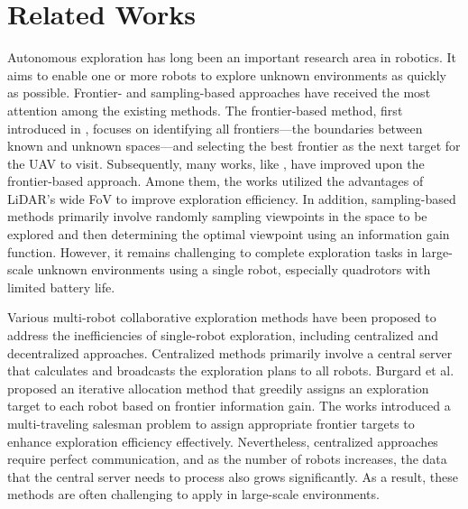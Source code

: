 \documentclass[letterpaper, 10pt, journal, twoside]{support/IEEEtran}
\begin{document}
\section{Related Works}
\label{sec:related_work}

Autonomous exploration has long been an important research area in robotics. It aims to enable one or more robots to explore unknown environments as quickly as possible. Frontier- and sampling-based approaches have received the most attention among the existing methods. The frontier-based method, first introduced in \cite{yamauchi1997frontier}, focuses on identifying all frontiers—the boundaries between known and unknown spaces—and selecting the best frontier as the next target for the UAV to visit. 
Subsequently, many works, like \cite{zhang2024falcon, tang2023bubble} \cite{cieslewski2017rapid, batinovic2021multi, huang2023fael}, have improved upon the frontier-based approach. Amone them, the works \cite{huang2023fael, tang2023bubble} utilized the advantages of LiDAR's wide FoV to improve exploration efficiency. 
In addition, sampling-based methods \cite{zhang2021novel, witting2018history, lee2021real} primarily involve randomly sampling viewpoints in the space to be explored and then determining the optimal viewpoint using an information gain function. 
However, it remains challenging to complete exploration tasks in large-scale unknown environments using a single robot, especially quadrotors with limited battery life.

Various multi-robot collaborative exploration methods have been proposed to address the inefficiencies of single-robot exploration, including centralized and decentralized approaches. Centralized methods \cite{burgard2005coordinated, dong2019multi, tian2020search} primarily involve a central server that calculates and broadcasts the exploration plans to all robots. Burgard et al. \cite{burgard2005coordinated} proposed an iterative allocation method that greedily assigns an exploration target to each robot based on frontier information gain. 
The works \cite{dong2019multi, tian2020search} introduced a multi-traveling salesman problem to assign appropriate frontier targets to enhance exploration efficiency effectively. 
Nevertheless, centralized approaches require perfect communication, and as the number of robots increases, the data that the central server needs to process also grows significantly. As a result, these methods are often challenging to apply in large-scale environments.
\end{document}
